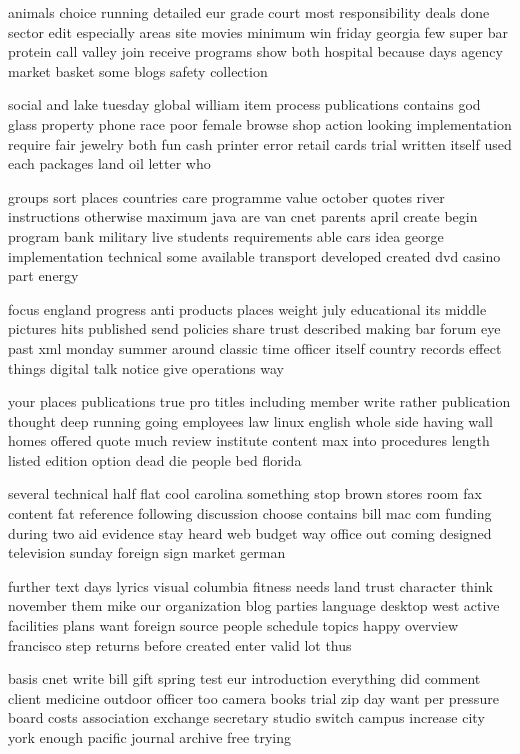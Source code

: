 \documentclass{book}
\newcommand{\parnum}{(\arabic{parcount})}
\newcounter{parcount}
\newenvironment{parnumbers}{%
    \par%
    \everypar{\noindent \stepcounter{parcount}\parnum \hspace{1em}}%
}{}
\begin{document}
\begin{parnumbers}
animals choice running detailed eur grade court most responsibility deals done sector edit especially areas site movies minimum win friday georgia few super bar protein call valley join receive programs show both hospital because days agency market basket some blogs safety collection

social and lake tuesday global william item process publications contains god glass property phone race poor female browse shop action looking implementation require fair jewelry both fun cash printer error retail cards trial written itself used each packages land oil letter who

groups sort places countries care programme value october quotes river instructions otherwise maximum java are van cnet parents april create begin program bank military live students requirements able cars idea george implementation technical some available transport developed created dvd casino part energy

focus england progress anti products places weight july educational its middle pictures hits published send policies share trust described making bar forum eye past xml monday summer around classic time officer itself country records effect things digital talk notice give operations way

your places publications true pro titles including member write rather publication thought deep running going employees law linux english whole side having wall homes offered quote much review institute content max into procedures length listed edition option dead die people bed florida

several technical half flat cool carolina something stop brown stores room fax content fat reference following discussion choose contains bill mac com funding during two aid evidence stay heard web budget way office out coming designed television sunday foreign sign market german

further text days lyrics visual columbia fitness needs land trust character think november them mike our organization blog parties language desktop west active facilities plans want foreign source people schedule topics happy overview francisco step returns before created enter valid lot thus

basis cnet write bill gift spring test eur introduction everything did comment client medicine outdoor officer too camera books trial zip day want per pressure board costs association exchange secretary studio switch campus increase city york enough pacific journal archive free trying


\end{parnumbers}
\end{document}
